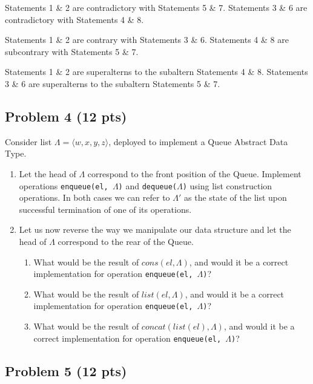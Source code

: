 \documentclass[12pt]{article}
\begin{document}
Statements 1 \& 2 are contradictory with Statements 5 \& 7. Statements 3 \& 6 are contradictory with Statements 4 \& 8. 

Statements 1 \& 2 are contrary with Statements 3 \& 6. Statements 4 \& 8 are subcontrary with Statements 5 \& 7.

Statements 1 \& 2 are superalterns to the subaltern Statements 4 \& 8. Statements 3 \& 6 are superalterns to the subaltern Statements 5 \& 7.





\newpage

\subsection{Problem 4 (12 pts)}

Consider list $\Lambda = \langle w, x, y, z \rangle$, deployed to implement a Queue Abstract Data Type.

\begin{enumerate}

\item Let the head of $\Lambda$ correspond to the front position of the Queue. Implement operations \texttt{enqueue(el, $\Lambda$)} and \texttt{dequeue($\Lambda$)} using list construction operations. In both cases we can refer to $\Lambda'$ as the state of the list upon successful termination of one of its operations.

\item Let us now reverse the way we manipulate our data structure and let the head of $\Lambda$ correspond to the rear of the Queue.
\begin{enumerate}
\item What would be the result of $cons(el, \Lambda)$, and would it be a correct implementation for operation \texttt{enqueue(el, $\Lambda$)}?
\item What would be the result of $list(el, \Lambda)$, and would it be a correct implementation for operation \texttt{enqueue(el, $\Lambda$)}?
\item What would be the result of $concat(list(el), \Lambda)$, and would it be a correct implementation for operation \texttt{enqueue(el, $\Lambda$)}?
\end{enumerate}
\end{enumerate}

\newpage

\subsection{Problem 5 (12 pts)}
\end{document}
